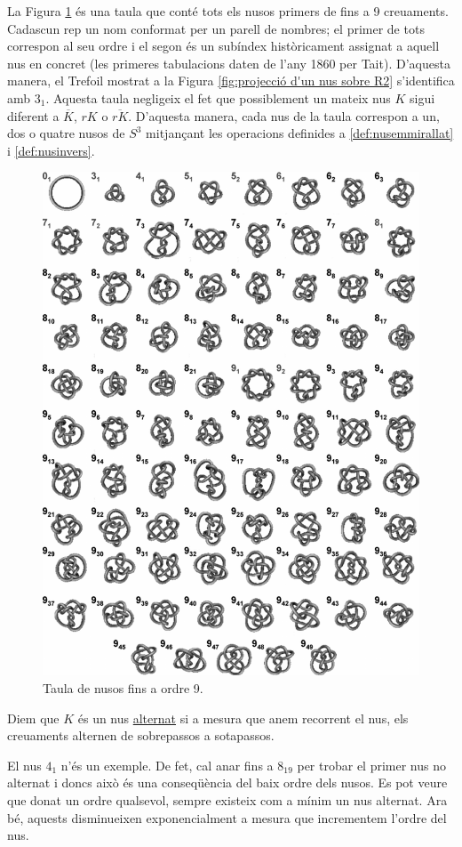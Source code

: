 La Figura \ref{fig:knotable} és una taula que conté tots els nusos primers de fins a 9 creuaments. Cadascun rep un nom conformat per un parell de nombres; el primer de tots correspon al seu ordre i el segon és un subíndex històricament assignat a aquell nus en concret (les primeres tabulacions daten de l'any 1860 per Tait). D'aquesta manera, el Trefoil mostrat a la Figura \ref{fig:projecció d'un nus sobre R2} s'identifica amb $3_1$. Aquesta taula negligeix el fet que possiblement un mateix nus $K$ sigui diferent a $\overline{K}$, $rK$ o $\overline{rK}$. D'aquesta manera, cada nus de la taula correspon a un, dos o quatre nusos de $S^3$ mitjançant les operacions definides a \ref{def:nusemmirallat} i \ref{def:nusinvers}.

\begin{figure}
	\centering
	\includegraphics[width=0.9\linewidth]{img/knottable.png}
	\caption{Taula de nusos fins a ordre 9.}\label{fig:knotable}
\end{figure}

\begin{definition}\label{def:nusalternat}
	Diem que $K$ és un nus \underline{alternat} si a mesura que anem recorrent el nus, els creuaments alternen de sobrepassos a sotapassos.
\end{definition}

El nus $4_1$ n'és un exemple. De fet, cal anar fins a $8_{19}$ per trobar el primer nus no alternat i doncs això és una conseqüència del baix ordre dels nusos. Es pot veure que donat un ordre qualsevol, sempre existeix com a mínim un nus alternat. Ara bé, aquests disminueixen exponencialment a mesura que incrementem l'ordre del nus.
